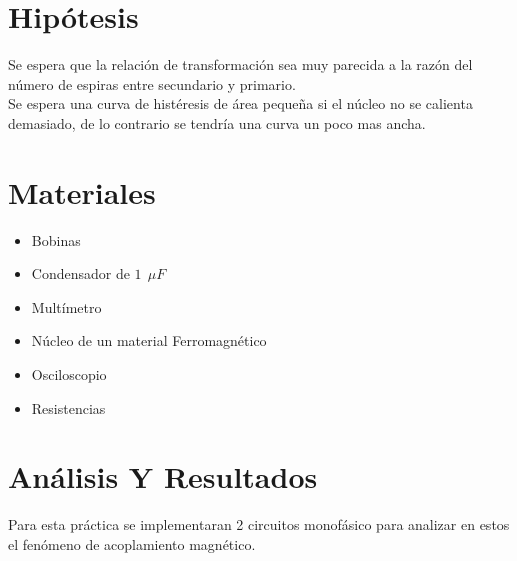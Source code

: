 \documentclass[twocolumn]{IEEEtran}
\begin{document}
\section{Hipótesis}
\noindent
Se espera que la relación de transformación sea muy parecida a la razón del número de espiras entre secundario  y primario.\\
Se espera una curva de histéresis de área pequeña si el núcleo no se calienta demasiado, de lo contrario se tendría una curva un poco mas ancha.

\section{Materiales}
\begin{itemize}
 \item Bobinas
 \item Condensador de $1\ \ \mu F$
 \item Multímetro
 \item Núcleo de un material Ferromagnético
 \item Osciloscopio
 \item Resistencias
\end{itemize}

\section{Análisis Y Resultados}
\noindent
Para esta práctica se implementaran 2 circuitos monofásico para analizar en estos el fenómeno de acoplamiento magnético.
\end{document}
